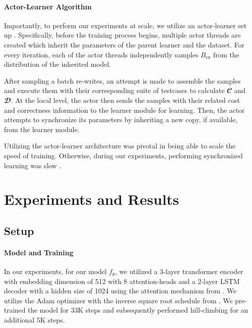 \documentclass{article}
\begin{document}

\paragraph{Actor-Learner Algorithm}

Importantly, to perform our experiments at scale, we utilize an actor-learner set up  \citep{liang2018memory, espeholt2018impala}. Specifically, before the training process begins, multiple actor threads are created which inherit the parameters of the parent learner and the dataset. For every iteration, each of the actor threads independently samples $B_{\textrm{ex}}$ from the distribution of the inherited model. 

After sampling a batch re-writes, an attempt is made to assemble the samples and execute them with their corresponding suite of testcases to calculate $\mathbfcal{C}$ and $\mathbfcal{D}$. At the local level, the actor then sends the samples with their related cost and correctness information to the learner module for learning. Then, the actor attempts to synchronize its parameters by inheriting a new copy, if available, from the learner module.

Utilizing the actor-learner architecture was pivotal in being able to scale the speed of training. Otherwise, during our experiments, performing synchronized learning was slow . 


\section{Experiments and Results}
\label{sec:experiments}

\subsection{Setup}

\paragraph{Model and Training} In our experiments, for our model $f_{\theta}$, we utilized a 3-layer transformer encoder with embedding dimension of 512 with 8 attention-heads and a 2-layer LSTM decoder with a hidden size of 1024 using the attention mechanism from \citet{bahdanau2014neural}. We utilize the Adam optimizer \cite{kingma2014adam} with the inverse square root schedule from \citet{vaswani2017attention}. We pre-trained the model for 33K steps and subsequently performed hill-climbing for an additional 5K steps. 
\end{document}
